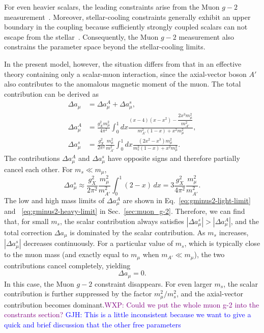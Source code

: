 \documentclass[onecolumn, aps, nofootinbib, prd, preprint, floats, floatfix, amsmath, amssymb, superscriptaddress, preprintnumbers]{revtex4-2}
\newcommand{\GJH}[1]{\textcolor{blue} {GJH: #1}}
\newcommand{\WXP}[1]{\textcolor{purple} {WXP: #1}}
\begin{document}
For even heavier scalars, the leading constraints arise from the Muon $g-2$ measurement~\cite{Chen:2015vqy}.
Moreover, stellar-cooling constraints generally exhibit an upper boundary in the coupling because sufficiently strongly coupled scalars can not escape from the stellar~\cite{Caputo:2021rux, Balazs:2022tjl}.
Consequently, the Muon $g-2$ measurement also constrains the parameter space beyond the stellar-cooling limits.

In the present model, however, the situation differs from that in an effective theory containing only a scalar-muon interaction, since the axial-vector boson $A'$ also contributes to the anomalous magnetic moment of the muon.
The total contribution can be derived as~\cite{Leveille:1977rc, Tucker-Smith:2010wdq}
\begin{equation}
\begin{aligned}
\Delta a_\mu &= \Delta a^A_\mu+\Delta a^s_\mu,\\
\Delta a^A_\mu
&=
\frac{g_X^2 m^2_\mu}{4\pi^2}
\int_0^1dx
\frac{(x-4)(x-x^2)-\dfrac{2x^3m_\mu^2}{m_{A'}^2}}
{m_{A'}^2(1-x)+x^2m_\mu^2},\\
\Delta a^s_\mu
&=
\frac{g_X^2}{2\pi^2}
\frac{m_\mu^2}{m_{A'}^2}
\int_0^1dx
\frac{(2x^2-x^3)m_\mu^2}
{m_s^2(1-x)+x^2m_\mu^2}.
\end{aligned}
\end{equation}
The contributions $\Delta a_\mu^A$ and $\Delta a_\mu^s$ have opposite signs and therefore partially cancel each other.
For
$m_s\ll m_\mu$,
\begin{equation}
\Delta a^s_\mu
\approx
\frac{g_X^2}{2\pi^2}
\frac{m_\mu^2}{m_{A'}^2}
\int_0^1(2-x)\,dx
=
3
\frac{g_X^2}{4\pi^2}
\frac{m_\mu^2}{m_{A'}^2}.
\end{equation}
The low and high mass limits of $\Delta a^A_\mu$ are shown in Eq.~\eqref{eq:gminus2-light-limit} and ~\eqref{eq:gminus2-heavy-limit} in Sec.~\ref{sec:muon_g-2}.
Therefore, we can find that, for small $m_s$, the scalar contribution always satisfies
$|\Delta a_\mu^s|>|\Delta a_\mu^A|$,
and the total correction $\Delta a_\mu$ is dominated by the scalar contribution.
As $m_s$ increases, $|\Delta a_\mu^s|$ decreases continuously.
For a particular value of $m_s$, which is typically close to the muon mass (and exactly equal to $m_\mu$ when $m_{A'}\ll m_\mu$), the two contributions cancel completely, yielding
\begin{equation}
\Delta a_\mu=0.
\end{equation}
In this case, the Muon $g-2$ constraint disappears.
For even larger $m_s$, the scalar contribution is further suppressed by the factor
$m_\mu^2/m_s^2$,
and the axial-vector contribution becomes dominant.\WXP{Could we put the whole muon g-2 into the constrants section?} \GJH{This is a little inconsistent because we want to give a quick and brief discussion that the other free parameters}
\end{document}
